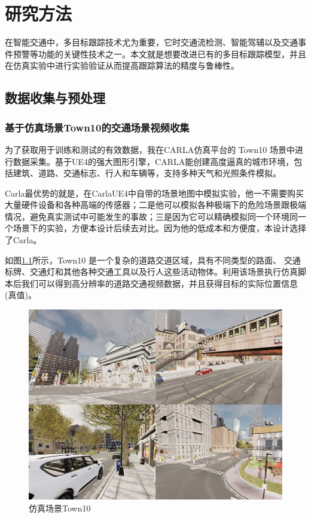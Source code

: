 \chapter{研究方法}


在智能交通中，多目标跟踪技术尤为重要，它时交通流检测、智能驾辅以及交通事件预警等功能的关键性技术之一。本文就是想要改进已有的多目标跟踪模型，并且在仿真实验中进行实验验证从而提高跟踪算法的精度与鲁棒性。


\section{数据收集与预处理}



\subsection{基于仿真场景Town10的交通场景视频收集}





为了获取用于训练和测试的有效数据，我在CARLA仿真平台的 Town10 场景中进行数据采集。基于UE4的强大图形引擎，CARLA能创建高度逼真的城市环境，包括建筑、道路、交通标志、行人和车辆等，支持多种天气和光照条件模拟。

Carla最优势的就是，在CarlaUE4中自带的场景地图中模拟实验，他一不需要购买大量硬件设备和各种高端的传感器；二是他可以模拟各种极端下的危险场景跟极端情况，避免真实测试中可能发生的事故；三是因为它可以精确模拟同一个环境同一个场景下的实验，方便本设计后续去对比。因为他的低成本和方便度，本设计选择了Carla。

如图\ref{fig:p39}所示，Town10 是一个复杂的道路交道区域，具有不同类型的路面、 交通标牌、交通灯和其他各种交通工具以及行人这些活动物体。利用该场景执行仿真脚本后我们可以得到高分辨率的道路交通视频数据，并且获得目标的实际位置信息(真值)。


\begin{figure}[htbp] %
	\centering
	\includegraphics[width=1\textwidth]{p39} %
	\caption{仿真场景Town10} %
	\label{fig:p39} %
\end{figure}





